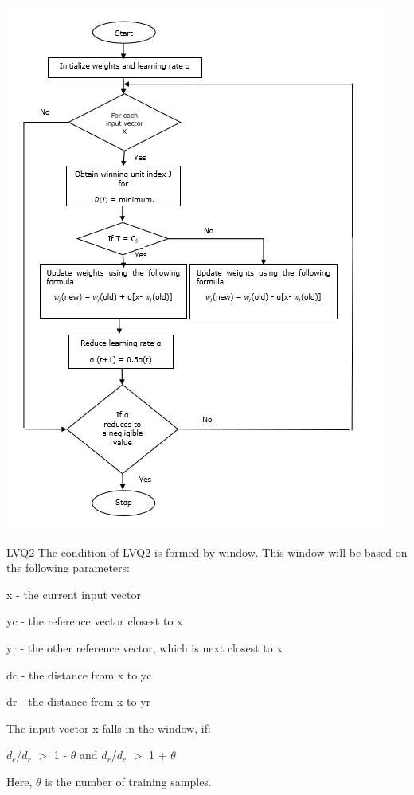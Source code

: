 \documentclass{beamer}
\begin{document}
\begin{frame}
\includegraphics[scale=0.5]{flowchart.png} 
\end{frame}

\begin{frame}{LVQ2}
The condition of LVQ2 is formed by window. This window will be based on the following parameters:

    x - the current input vector

    yc - the reference vector closest to x

    yr - the other reference vector, which is next closest to x

    dc - the distance from x to yc

    dr - the distance from x to yr
    
    
    \vspace{2 mm}

The input vector x falls in the window, if:
\setlength{\parindent}{2cm}


$d_c$/$d_r$ $>$ 1 - $\theta$   and    $d_r$/$d_c$ $>$ 1 + $\theta$

Here, $\theta$ is the number of training samples.
\end{frame}
\end{document}
